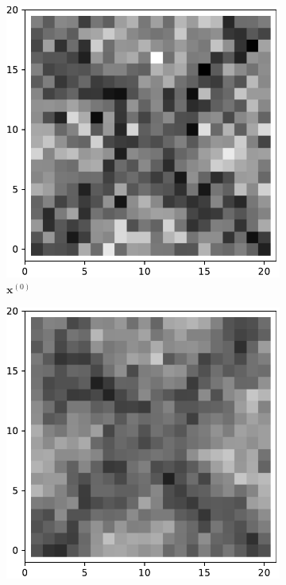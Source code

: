    \begin{figure}[!h]
        \centering
        \begin{subfigure}[b]{0.24\textwidth}
            \centering
            \includegraphics[width=\textwidth]{./img/ximage.pdf}
            \caption[]%
            {{\small $\mathbf{x}^{(0)}$}}    
            \label{fig:ximage7}
        \end{subfigure}
        \begin{subfigure}[b]{0.24\textwidth}  
            \centering 
            \includegraphics[width=\textwidth]{./img/5755d1-0.pdf}

\end{subfigure}
\end{figure}
